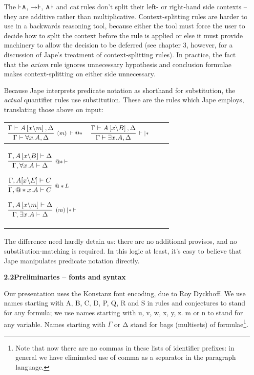 \documentclass[11pt]{book}
\newcommand{\tab}{\hspace{5mm}}
\newcommand{\reason}[1]{\scalebox{0.85}{#1}}
\begin{document}
The ⊦∧, →⊦, ∧⊦ and \textit{cut} rules don't split their left- or right-hand side contexts -- they are additive rather than multiplicative. Context-splitting rules are harder to use in a backwards reasoning tool, because either the tool must force the user to decide how to split the context before the rule is applied or else it must provide machinery to allow the decision to be deferred (see chapter 3, however, for a discussion of Jape's treatment of context-splitting rules). In practice, the fact that the \textit{axiom} rule ignores unnecessary hypothesis and conclusion formulae makes context-splitting on either side unnecessary.


Because Jape interprets predicate notation as shorthand for substitution, the \textit{actual} quantifier rules use substitution. These are the rules which Jape employs, translating those above on input:\\


\begin{tabular}{|p{2.220in}|p{2.194in}|p{0.043in}|p{0.043in}|}
\hline
{\raggedright 
$\infer[\reason{$(m)\; |- @*$}]
       {\Gamma  |- \forall
x.A,\Delta }
       {\Gamma  |- A\left[ x\backslash m\right],\Delta }$
} & 
{\raggedright 
$\infer[\reason{$ |-|*$}]
       {\Gamma  |- \exists
x.A,\Delta }
       {\Gamma  |- A\left[ x\backslash B\right],\Delta }$
}\\
\hline
{\raggedright 
$\infer[\reason{$@*|- $}]
       {\Gamma,\forall
x.A |- \Delta }
       {\Gamma,A\left[ x\backslash B\right]  |- \Delta }$

$\infer[\reason{$@*L$}]
       {\Gamma,@*x.A |- C}
       {\Gamma,A[x\backslash E] |- C}$

$\infer[\reason{$(m)\;|*|- $}]
       {\Gamma,\exists
x.A |- \Delta }
       {\Gamma,A\left[ x\backslash m\right]  |- \Delta }$
}\\
\hline
\end{tabular}


The difference need hardly detain us: there are no additional provisos, and no substitution-matching is required. In this logic at least, it's easy to believe that Jape manipulates predicate notation directly.


\textbf{{\large 2.2\tab Preliminaries -- fonts and syntax}}


Our presentation uses the Konstanz font encoding, due to Roy Dyckhoff. We use names starting with A, B, C, D, P, Q, R and S in rules and conjectures to stand for any formula; we use names starting with u, v, w, x, y, z. m or n to stand for any variable. Names starting with \ensuremath{\Gamma} or Δ stand for bags (multisets) of formulae\footnote{Note that now there are no commas in these lists of identifier prefixes: in general we have eliminated use of comma as a separator in the paragraph language.}.
\end{document}
